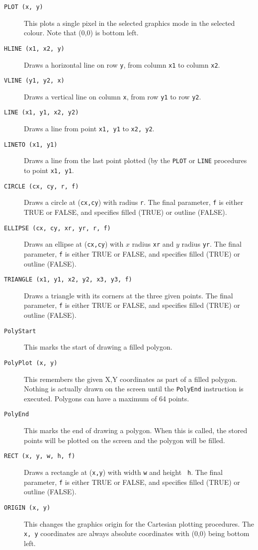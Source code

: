 \begin{description}
\item[{\tt PLOT (x, y)}]
This plots a single pixel in the selected graphics mode in the selected
colour. Note that (0,0) is bottom left.
\item[{\tt HLINE (x1, x2, y)}]
Draws a horizontal line on row {\tt y}, from column {\tt x1} to column {\tt x2}.
\item[{\tt VLINE (y1, y2, x)}]
Draws a vertical line on column {\tt x}, from row {\tt y1} to row {\tt y2}.
\item[{\tt LINE (x1, y1, x2, y2)}]
Draws a line from point {\tt x1, y1} to {\tt x2, y2}.
\item[{\tt LINETO (x1, y1)}]
Draws a line from the last point plotted (by the {\tt PLOT} or {\tt LINE}
procedures to point {\tt x1, y1}.

\item[{\tt CIRCLE (cx, cy, r, f)}]
Draws a circle at ({\tt cx,cy}) with radius {\tt r}. The final parameter,
{\tt f} is either TRUE or FALSE, and specifies filled (TRUE) or outline
(FALSE).

\item[{\tt ELLIPSE (cx, cy, xr, yr, r, f)}]
Draws an ellipse at ({\tt cx,cy}) with $x$ radius {\tt xr} and $y$
radius {\tt yr}. The final parameter, {\tt f} is either TRUE or FALSE,
and specifies filled (TRUE) or outline (FALSE).

\item[{\tt TRIANGLE (x1, y1, x2, y2, x3, y3, f)}]
Draws a triangle with its corners at the three given points.
The final parameter, {\tt f} is either TRUE or FALSE, and specifies
filled (TRUE) or outline (FALSE).

\item[{\tt PolyStart}] This marks the start of
drawing a filled polygon.

\item[{\tt PolyPlot (x, y)}]
This remembers the given X,Y coordinates as part of a filled polygon.
Nothing is actually drawn on the screen until the {\tt PolyEnd}
instruction is executed. Polygons can have a maximum of 64 points.

\item[{\tt PolyEnd}] This marks the end of
drawing a polygon. When this is called, the stored points will
be plotted on the screen and the polygon will be filled.


\item[{\tt RECT (x, y, w, h, f)}]
Draws a rectangle at ({\tt x,y}) with width {\tt w} and height {\tt
h}. The final parameter, {\tt f} is either TRUE or FALSE, and specifies
filled (TRUE) or outline (FALSE).

\item[{\tt ORIGIN (x, y)}]
This changes the graphics origin for the Cartesian plotting
procedures. The {\tt x, y} coordinates are always absolute coordinates
with (0,0) being bottom left.
\end{description}

